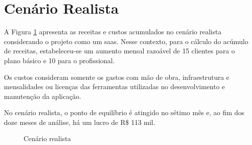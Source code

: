 \section{Cenário Realista}

A Figura \ref{fig:cenario-realista} apresenta as receitas e custos acumulados no cenário realista considerando o projeto como um \gls{saas}. Nesse contexto, para o cálculo do acúmulo de receitas, estabeleceu-se um aumento mensal razoável de 15 clientes para o plano básico e 10 para o profissional.

Os custos consideram somente os gastos com mão de obra, infraestrutura e mensalidades ou licenças das ferramentas utilizadas no desenvolvimento e manutenção da aplicação.

No cenário realista, o ponto de equilíbrio é atingido no sétimo mês e, ao fim dos doze meses de análise, há um lucro de R\$ 113 mil.

\begin{figure}[h]
	\centering
	\caption{Cenário realista}
	\label{fig:cenario-realista}
\end{figure}